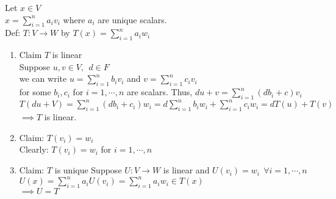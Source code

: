 Let $x \in V$ \\
$x = \sum^n_{i=1}a_iv_i$ where $a_i$ are unique scalars. \\
Def: $T:V \rightarrow W$ by $T(x)=\sum^n_{i=1}a_iw_i$ \\
\begin{enumerate}
	\item Claim $T$ is linear \\
	Suppose $u, v \in V ,\ \ d \in F$ \\
	we can write $u =  \sum^n_{i=1}b_iv_i$ and $v=\sum^n_{i=1}c_iv_i$ \\
	for some $b_i, c_i$ for $i=1,\cdots,n$ are scalars. Thus, $du + v = \sum^n_{i=1}(db_i+c)v_i$ \\
	$T(du+V) = \sum^n_{i=1}(db_i+c_i)w_i = d\sum^n_{i=1}b_iw_i + \sum^n_{i=1}c_iw_i = dT(u) + T(v)$ \\
	$\implies T$ is linear.
	\item Claim: $T(v_i)=w_i$ \\
	Clearly: $T(v_i)=w_i$ for $i=1,\cdots,n$
	\item Claim: $T$ is unique
	Suppose $U:V \rightarrow W$ is linear and $U(v_i)=w_i \ \ \forall i=1,\cdots,n$ \\
	$U(x) = \sum^n_{i=1}a_iU(v_i) = \sum^n_{i=1}a_iw_i \in T(x)$ \\
	$\implies U = T$
\end{enumerate}
